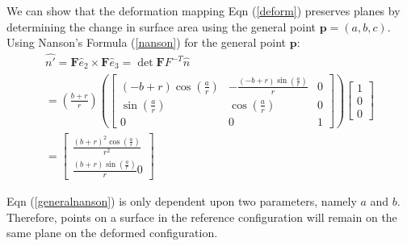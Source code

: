 \begin{problem}
    \noindent
    \normalfont

    We can show that the deformation mapping Eqn (\ref{deform}) preserves planes by determining the change in surface area using the general point $\mathbf{p}=(a,b,c)$. Using Nanson's Formula (\ref{nanson}) for the general point $\mathbf{p}$:
    \begin{align}
    \hat{n'}=\mathbf{F}\hat{e}_{2}\times \mathbf{F}\hat{e}_{3}=\det \mathbf{F}F^{-T}\hat{n} \\
    =\left( \frac{b+r}{r} \right)\left( \begin{bmatrix}
    \left( -b+r \right)\cos\left( \frac{a}{r} \right)&-\frac{\left( -b+r \right)\sin\left( \frac{a}{r} \right)}{r} & 0 \\
    \sin\left( \frac{a}{r} \right) & \cos\left( \frac{a}{r} \right) & 0 \\
    0 & 0 & 1
    \end{bmatrix} \right)\begin{bmatrix}
    1 \\
    0 \\
    0
    \end{bmatrix} \\
    = \begin{bmatrix}
    \frac{(b+r)^2\cos\left( \frac{a}{r} \right)}{r^2} \\
    \frac{(b+r)\sin\left( \frac{a}{r} \right)}{r}
    0
    \end{bmatrix} \label{generalnanson}
    \end{align}
    
    Eqn (\ref{generalnanson}) is only dependent upon two parameters, namely $a$ and $b$. Therefore, points on a surface in the reference configuration will remain on the same plane on the deformed configuration.\end{problem}
